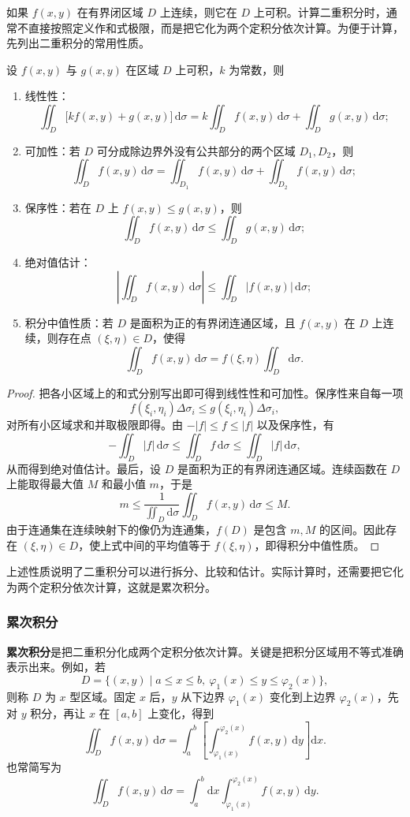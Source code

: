 \documentclass[fontset=fandol]{ctexart}
\newcommand{\dd}{\mathrm{d}}
\begin{document}
如果 $f(x,y)$ 在有界闭区域 $D$ 上连续，则它在 $D$ 上可积。计算二重积分时，通常不直接按照定义作和式极限，而是把它化为两个定积分依次计算。为便于计算，先列出二重积分的常用性质。

\begin{theorem}[二重积分的性质]
设 $f(x,y)$ 与 $g(x,y)$ 在区域 $D$ 上可积，$k$ 为常数，则
\begin{enumerate}
\item 线性性：
\[
\iint_D\bigl[kf(x,y)+g(x,y)\bigr]\,\dd\sigma
=k\iint_Df(x,y)\,\dd\sigma+\iint_Dg(x,y)\,\dd\sigma;
\]
\item 可加性：若 $D$ 可分成除边界外没有公共部分的两个区域 $D_1,D_2$，则
\[
\iint_Df(x,y)\,\dd\sigma
=\iint_{D_1}f(x,y)\,\dd\sigma+\iint_{D_2}f(x,y)\,\dd\sigma;
\]
\item 保序性：若在 $D$ 上 $f(x,y)\leq g(x,y)$，则
\[
\iint_Df(x,y)\,\dd\sigma\leq\iint_Dg(x,y)\,\dd\sigma;
\]
\item 绝对值估计：
\[
\left|\iint_Df(x,y)\,\dd\sigma\right|
\leq\iint_D|f(x,y)|\,\dd\sigma;
\]
\item 积分中值性质：若 \(D\) 是面积为正的有界闭连通区域，且 \(f(x,y)\) 在 \(D\) 上连续，则存在点 \((\xi,\eta)\in D\)，使得
\[
\iint_Df(x,y)\,\dd\sigma=f(\xi,\eta)\iint_D\dd\sigma.
\]
\end{enumerate}
\end{theorem}

\begin{proof}
把各小区域上的和式分别写出即可得到线性性和可加性。保序性来自每一项
\[
f(\xi_i,\eta_i)\Delta\sigma_i
\leq g(\xi_i,\eta_i)\Delta\sigma_i,
\]
对所有小区域求和并取极限即得。由 $-|f|\leq f\leq|f|$ 以及保序性，有
\[
-\iint_D|f|\,\dd\sigma
\leq\iint_Df\,\dd\sigma
\leq\iint_D|f|\,\dd\sigma,
\]
从而得到绝对值估计。最后，设 \(D\) 是面积为正的有界闭连通区域。连续函数在 \(D\) 上能取得最大值 \(M\) 和最小值 \(m\)，于是
\[
m\leq\frac{1}{\iint_D\dd\sigma}\iint_Df(x,y)\,\dd\sigma\leq M.
\]
由于连通集在连续映射下的像仍为连通集，\(f(D)\) 是包含 \(m,M\) 的区间。因此存在 \((\xi,\eta)\in D\)，使上式中间的平均值等于 \(f(\xi,\eta)\)，即得积分中值性质。
\end{proof}

上述性质说明了二重积分可以进行拆分、比较和估计。实际计算时，还需要把它化为两个定积分依次计算，这就是累次积分。

\subsubsection*{累次积分}

\textbf{累次积分}是把二重积分化成两个定积分依次计算。关键是把积分区域用不等式准确表示出来。例如，若
\[
D=\{(x,y)\mid a\leq x\leq b,\ \varphi_1(x)\leq y\leq\varphi_2(x)\},
\]
则称 $D$ 为 $x$ 型区域。固定 $x$ 后，$y$ 从下边界 $\varphi_1(x)$ 变化到上边界 $\varphi_2(x)$，先对 $y$ 积分，再让 $x$ 在 $[a,b]$ 上变化，得到
\[
\iint_Df(x,y)\,\dd\sigma
=\int_a^b\left[\int_{\varphi_1(x)}^{\varphi_2(x)}f(x,y)\,\dd y\right]\dd x.
\]
也常简写为
\[
\iint_Df(x,y)\,\dd\sigma
=\int_a^b\dd x\int_{\varphi_1(x)}^{\varphi_2(x)}f(x,y)\,\dd y.
\]
\end{document}
